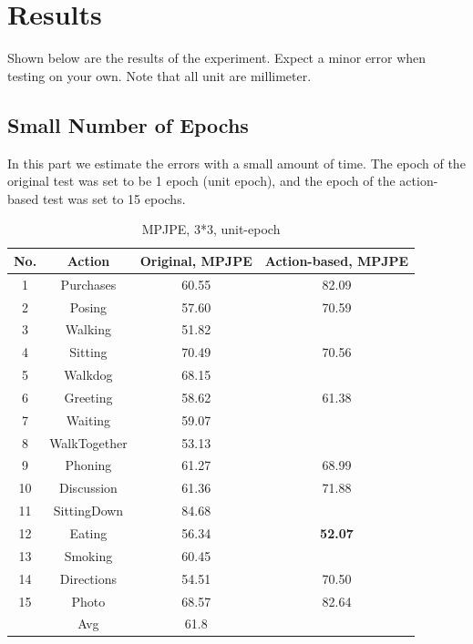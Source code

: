 \documentclass[10pt,twocolumn,letterpaper]{article}
\begin{document}

\section{Results}

Shown below are the results of the experiment. Expect a minor error when testing on your own. Note that all
unit are millimeter.

\subsection{Small Number of Epochs}

In this part we estimate the errors with a small amount of time. The epoch of the original test was set to 
be 1 epoch (unit epoch), and the epoch of the action-based test was set to 15 epochs.

\begin{table}[H]
\caption{MPJPE, 3*3, unit-epoch}

\begin{tabular}{cccc}

\hline
No. & Action & Original, MPJPE & Action-based, MPJPE\\
\hline

1&Purchases& 60.55 & 82.09 \\
2&Posing& 57.60 & 70.59\\
3&Walking& 51.82 \\
4&Sitting& 70.49 & 70.56 \\
5&Walkdog& 68.15 & \\
6&Greeting& 58.62 & 61.38\\
7&Waiting& 59.07 & \\
8&WalkTogether& 53.13 & \\
9&Phoning& 61.27 & 68.99 \\
10&Discussion& 61.36 & 71.88 \\
11&SittingDown& 84.68 & \\
12&Eating&  56.34 & \textbf{52.07} \\
13&Smoking& 60.45 & \\
14&Directions& 54.51 & 70.50 \\
15&Photo& 68.57 & 82.64\\
&Avg& 61.8 &\\


\hline
\end{tabular}
\end{table}
\end{document}
